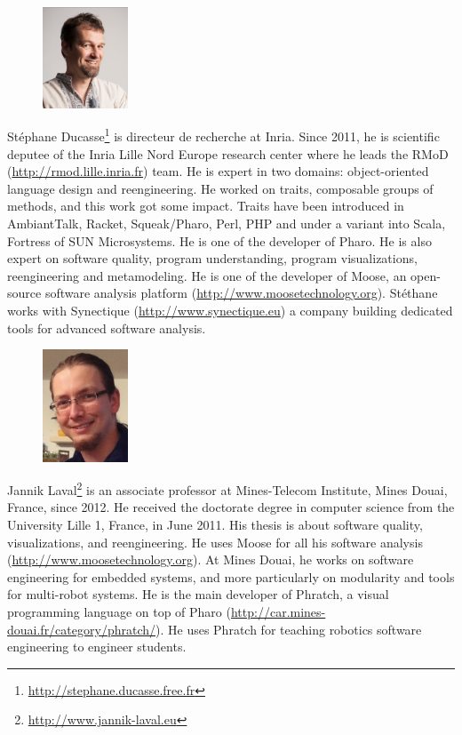 \documentclass[a4paper,10pt,twoside]{book}
\begin{document}
\begin{figure}
\centering
\includegraphics[width=1in]{stephane}
\end{figure}
St\'ephane Ducasse\footnote{\url{http://stephane.ducasse.free.fr}} is directeur de recherche at Inria. Since 2011, he is scientific deputee of the Inria Lille Nord Europe 
research center where he leads the RMoD (\url{http://rmod.lille.inria.fr}) team. He is expert in two domains: object-oriented language design and reengineering.  He worked on traits, composable groups of methods, and this work got some impact. Traits have been introduced in AmbiantTalk, Racket, Squeak/Pharo, Perl, PHP and  under a variant into Scala, Fortress of SUN Microsystems. He is one of the developer of Pharo. He is also expert on software quality, program understanding, program visualizations, reengineering and metamodeling. He is one of the developer of Moose, an open-source software analysis platform (\url{http://www.moosetechnology.org}).  St\'ethane works with Synectique (\url{http://www.synectique.eu}) a company building dedicated tools for advanced software analysis.


\begin{figure}
\centering
\includegraphics[width=1in]{jannik}
\end{figure}
Jannik Laval\footnote{\url{http://www.jannik-laval.eu}} is an associate professor at Mines-Telecom Institute, Mines Douai, France, since 2012. He received the doctorate degree in computer science from the University Lille 1, France, in June 2011. His thesis is about software quality, visualizations, and reengineering. He uses Moose for all his software analysis (\url{http://www.moosetechnology.org}).
At Mines Douai, he works on software engineering for embedded systems, and more particularly on modularity and tools for multi-robot systems. He is the main developer of Phratch, a visual programming language on top of Pharo (\url{http://car.mines-douai.fr/category/phratch/}). He uses Phratch for teaching robotics software engineering to engineer students. 



\ifx\wholebook\relax\else
   
   
\end{document}
